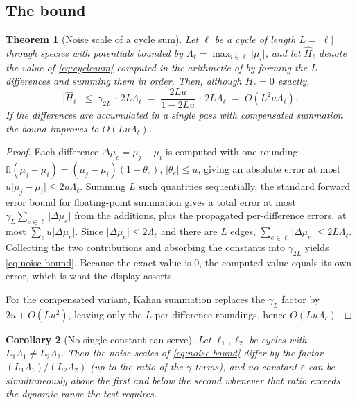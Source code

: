 \documentclass[11pt,twocolumn,a4paper]{article}
\theoremstyle{pstyle}
\newtheorem{theorem}{Theorem}[section]
\newtheorem{corollary}[theorem]{Corollary}
\theoremstyle{definition}
\theoremstyle{remark}
\newcommand{\abs}[1]{\lvert#1\rvert}
\newcommand{\eps}{\varepsilon}
\newcommand{\hol}{H}
\newcommand{\mach}{u}
\begin{document}
\subsection{The bound}

\begin{theorem}[Noise scale of a cycle sum]
\label{thm:noise-scale}
Let $\ell$ be a cycle of length $L=\abs{\ell}$ through species with
potentials bounded by $\Lambda_\ell = \max_{i\in\ell}\abs{\mu_i}$, and
let $\widehat{\hol}_\ell$ denote the value of \eqref{eq:cyclesum}
computed in the arithmetic of  by forming the $L$
differences and summing them in order. Then, although
$\hol_\ell = 0$ exactly,
\begin{equation}
  \bigl\lvert\widehat{\hol}_\ell\bigr\rvert
  \;\le\; \gamma_{2L}\,\cdot\,2L\Lambda_\ell
  \;=\; \frac{2L\mach}{1-2L\mach}\,\cdot\,2L\Lambda_\ell
  \;=\; O\!\left(L^{2}\mach\Lambda_\ell\right).
  \label{eq:noise-bound}
\end{equation}
If the differences are accumulated in a single pass with compensated
summation the bound improves to $O(L\mach\Lambda_\ell)$.
\end{theorem}

\begin{proof}
Each difference $\Delta\mu_e = \mu_j-\mu_i$ is computed with one
rounding: $\mathrm{fl}(\mu_j-\mu_i) = (\mu_j-\mu_i)(1+\theta_e)$,
$\abs{\theta_e}\le\mach$, giving an absolute error at most
$\mach\abs{\mu_j-\mu_i}\le 2\mach\Lambda_\ell$. Summing $L$ such
quantities sequentially, the standard forward error bound for
floating-point summation \citep[Ch.~4]{higham2002} gives a total error
at most $\gamma_{L}\sum_{e\in\ell}\abs{\Delta\mu_e}$ from the additions,
plus the propagated per-difference errors, at most
$\sum_{e}\mach\abs{\Delta\mu_e}$. Since
$\abs{\Delta\mu_e}\le 2\Lambda_\ell$ and there are $L$ edges,
$\sum_{e\in\ell}\abs{\Delta\mu_e}\le 2L\Lambda_\ell$. Collecting the two
contributions and absorbing the constants into $\gamma_{2L}$ yields
\eqref{eq:noise-bound}. Because the exact value is $0$, the computed
value equals its own error, which is what the display asserts.

For the compensated variant, Kahan summation \citep{kahan1965,
higham2002} replaces the $\gamma_L$ factor by $2\mach + O(L\mach^{2})$,
leaving only the $L$ per-difference roundings, hence
$O(L\mach\Lambda_\ell)$.
\end{proof}

\begin{corollary}[No single constant can serve]
\label{cor:no-constant}
Let $\ell_1,\ell_2$ be cycles with $L_1\Lambda_1 \ne L_2\Lambda_2$. Then
the noise scales of \eqref{eq:noise-bound} differ by the factor
$(L_1\Lambda_1)/(L_2\Lambda_2)$ (up to the ratio of the $\gamma$
terms), and no constant $\eps$ can be simultaneously above the first and
below the second whenever that ratio exceeds the dynamic range the test
requires.
\end{corollary}
\end{document}
